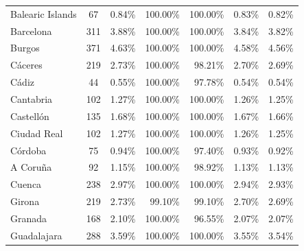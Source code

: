 \documentclass[a4paper,11pt,oneside]{article}
\begin{document}
{\begin{table}
{\begin{tabular}{lcrrrrr}
Balearic Islands           & 67                             & 0.84\%          & 100.00\%      & 100.00\%      & 0.83\%                 & 0.82\%                 \\
Barcelona          & 311                            & 3.88\%          & 100.00\%      & 100.00\%      & 3.84\%                 & 3.82\%                 \\
Burgos             & 371                            & 4.63\%          & 100.00\%      & 100.00\%      & 4.58\%                 & 4.56\%                 \\
Cáceres            & 219                            & 2.73\%          & 100.00\%      & 98.21\%       & 2.70\%                 & 2.69\%                 \\
Cádiz              & 44                             & 0.55\%          & 100.00\%      & 97.78\%       & 0.54\%                 & 0.54\%                 \\
Cantabria          & 102                            & 1.27\%          & 100.00\%      & 100.00\%      & 1.26\%                 & 1.25\%                 \\
Castellón          & 135                            & 1.68\%          & 100.00\%      & 100.00\%      & 1.67\%                 & 1.66\%                 \\
Ciudad Real        & 102                            & 1.27\%          & 100.00\%      & 100.00\%      & 1.26\%                 & 1.25\%                 \\
Córdoba            & 75                             & 0.94\%          & 100.00\%      & 97.40\%       & 0.93\%                 & 0.92\%                 \\
A Coruña           & 92                             & 1.15\%          & 100.00\%      & 98.92\%       & 1.13\%                 & 1.13\%                 \\
Cuenca             & 238                            & 2.97\%          & 100.00\%      & 100.00\%      & 2.94\%                 & 2.93\%                 \\
Girona             & 219                            & 2.73\%          & 99.10\%       & 99.10\%       & 2.70\%                 & 2.69\%                 \\
Granada            & 168                            & 2.10\%          & 100.00\%      & 96.55\%       & 2.07\%                 & 2.07\%                 \\
Guadalajara        & 288                            & 3.59\%          & 100.00\%      & 100.00\%      & 3.55\%                 & 3.54\%                 \\

\end{tabular}}
\end{table}}
\end{document}
